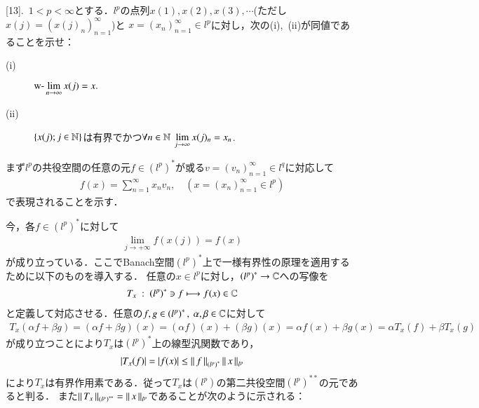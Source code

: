 [13].\ $1 < p < \infty$とする．$l^p$の点列$x(1),x(2),x(3),\cdots$(ただし$x(j)=\left(x(j)_n\right)_{n=1}^{\infty}$)と
$x=(x_n)_{n=1}^{\infty} \in l^p$に対し，次の(i),\ (ii)が同値であることを示せ：
\begin{description}
	\item[\rm{(i)}] $\displaystyle \mbox{w-}\lim_{n \to \infty} x(j) = x.$
	\item[\rm{(ii)}] $\left\{x(j);j\in\mathbb{N}\right\}$は有界でかつ$\forall n \in \mathbb{N}\ \displaystyle \lim_{j \to \infty}x(j)_n = x_n$.
\end{description}

\begin{prf}
\begin{description}\mbox{}
	\item[$l^p$の共役空間] まず$l^p$の共役空間の任意の元$f \in \left(l^p\right)^*$が或る$v = (v_n)_{n=1}^{\infty} \in l^q$に対応して
		\begin{align}
			f(x) = \sum_{n=1}^{\infty} x_n v_n, \quad \left(x = (x_n)_{n=1}^{\infty} \in l^p\right)
		\end{align}
		で表現されることを示す．
	\item[\rm{(i)} $\Rightarrow$ \rm{(ii)}]
		今，各$f \in \left(l^p\right)^*$に対して
		\begin{align}
			\lim_{j \to +\infty} f(x(j)) = f(x) \label{eq:func_analy_Q13_1}
		\end{align}
		が成り立っている．ここでBanach空間$\left(l^p\right)^*$上で一様有界性の原理を適用するために以下のものを導入する．
		任意の$x \in l^p$に対し，$\left(l^p\right)^* \rightarrow \mathbb{C}$への写像を
		\begin{align}
			T_x\ :\ \left(l^p\right)^* \ni f \longmapsto f(x) \in \mathbb{C} 
		\end{align}
		と定義して対応させる．任意の$f,g \in \left(l^p\right)^*,\ \alpha,\beta \in \mathbb{C}$に対して
		\begin{align}
			T_x(\alpha f + \beta g) = (\alpha f + \beta g)(x) = (\alpha f)(x) + (\beta g)(x) = \alpha f(x) + \beta g(x) = \alpha T_x(f) + \beta T_x(g)
		\end{align}
		が成り立つことにより$T_x$は$\left(l^p\right)^*$上の線型汎関数であり，
		\begin{align}
			|T_x(f)| = |f(x)| \leq \left\|\, f\, \right\|_{\left(l^p\right)^*} \left\|\, x\, \right\|_{l^p}
		\end{align}
		により$T_x$は有界作用素である．従って$T_x$は$\left(l^p\right)$の第二共役空間$\left(l^p\right)^{**}$の元であると判る．
		また$\left\|\, T_x\, \right\|_{\left(l^p\right)^{**}} = \left\|\, x\, \right\|_{l^p}$であることが次のように示される：

\end{description}
\end{prf}
